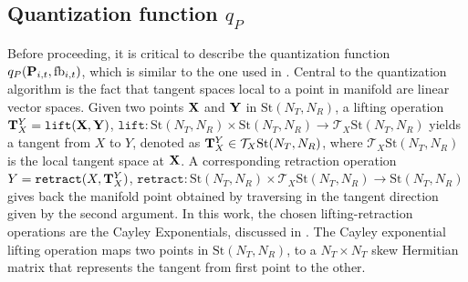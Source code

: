 \documentclass[conference]{IEEEtran}
\begin{document}
\subsection{Quantization function $q_P$}
\label{qp}
Before proceeding, it is critical to describe the quantization function $q_P({\bf P}_{i,t},\text{fb}_{i,t})$, which is similar to the one used in \cite{6891198,Gupt1905:Predictive,6545375}.
Central to the quantization algorithm is the fact that tangent spaces local to a point in manifold are linear vector spaces.
Given two points ${\bf X}$ and ${\bf Y}$ in $\text{St}(N_T,N_R)$, a lifting operation ${\bf T}^Y_X=\texttt{lift}({\bf X},{\bf Y})$, $\texttt{lift}:\text{St}(N_T,N_R)\times \text{St}(N_T,N_R) \to \mathcal{T}_X \text{St}(N_T,N_R)$ yields a tangent from $X$ to $Y$, denoted as ${\bf T}^Y_X \in \mathcal{T}_X \text{St}(N_T,N_R)$, where $\mathcal{T}_X \text{St}(N_T,N_R)$ is the local tangent space at ${\bf X}$.
A corresponding retraction operation $Y=\texttt{retract}(X,{\bf T}^Y_X)$, $\texttt{retract}: \text{St}(N_T,N_R)\times \mathcal{T}_X \text{St}(N_T,N_R) \to \text{St}(N_T,N_R)$ gives back the manifold point obtained by traversing in the tangent direction given by the second argument.
In this work, the chosen lifting-retraction operations are the Cayley Exponentials, discussed in \cite{DBLP:journals/corr/abs-1708-00045,Gupt1905:Predictive}. %
The Cayley exponential lifting operation maps two points in $\text{St}(N_T,N_R)$, to a $N_T\times N_T$ skew Hermitian matrix that represents the tangent from first point to the other.
\end{document}
